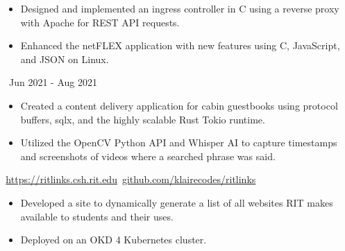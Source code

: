 \documentclass[11pt,letterpaper,ragged2e]{altacv}
\begin{document}
{
  \begin{itemize}
    \item Designed and implemented an ingress controller in C using a reverse proxy with Apache for REST API requests.
    \item Enhanced the netFLEX application with new features using C, JavaScript, and JSON on Linux.
  \end{itemize}
}
{\faCalendar\, Jun 2021 - Aug 2021}
{
}



{
  \begin{itemize}
    \item Created a content delivery application for cabin guestbooks using protocol buffers, sqlx, and the highly scalable Rust Tokio runtime.
  \end{itemize}
}
{
}

{
  \begin{itemize}
    \item Utilized the OpenCV Python API and Whisper AI to capture timestamps and screenshots of videos where a searched phrase was said.
  \end{itemize}
}
{
}

{
  {\faLink} \,\href{https://ritlinks.csh.rit.edu}{https://ritlinks.csh.rit.edu}\quad
  {\faGithub} \,\href{https://github.com/klairecodes/ritlinks}{github.com/klairecodes/ritlinks}
}
{
  \begin{itemize}
    \item Developed a site to dynamically generate a list of all websites RIT makes available to students and their uses.
    \item Deployed on an OKD 4 Kubernetes cluster.
  \end{itemize}
}
{
}


\clearpage

\nocite{*}
\end{document}
